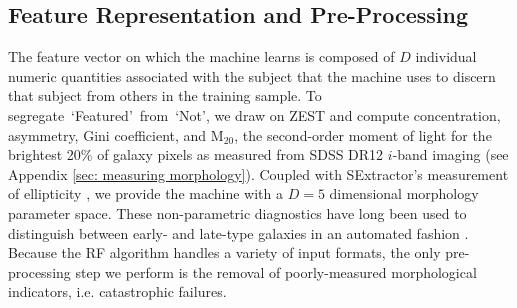\documentclass[twocolumn,  trackchanges,]{aastex6}%
\newcommand{\feat}{`Featured'}
\newcommand{\notfeat}{`Not'}
\begin{document}
\subsection{Feature Representation and Pre-Processing}
The feature vector on which the machine learns is composed of $D$ individual 
numeric quantities associated with the subject that the machine uses to discern 
that subject from others in the training sample. 
To segregate~\feat~from~\notfeat, we draw on ZEST \citep{Scarlata2007} and compute
 concentration, asymmetry, Gini coefficient, and M$_{20}$, 
the second-order moment of light for the brightest 20\% of galaxy pixels as
measured from SDSS DR12 $i$-band imaging (see Appendix \ref{sec: measuring morphology}). 
Coupled with SExtractor's measurement of ellipticity \citep{sextractor}, 
we provide the machine with a $D=5$ dimensional morphology parameter space.
These non-parametric diagnostics have long been used to
distinguish between early- and late-type galaxies 
in an automated fashion \cite[e.g.,][]{Abraham1996, Bershady2000, Conselice2000, Abraham2003, Conselice2003, Lotz2004, Snyder2015}.
Because the RF algorithm handles a variety of input formats, the only pre-processing 
step we perform is the removal of poorly-measured morphological indicators, i.e. catastrophic failures.
\end{document}
